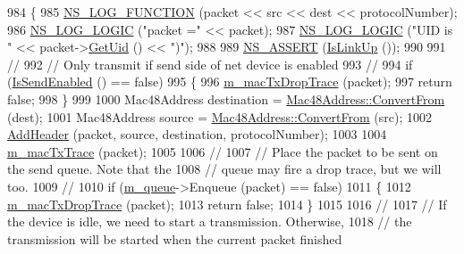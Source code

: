 \begin{DoxyCode}
984 \{
985   \hyperlink{log-macros-disabled_8h_a90b90d5bad1f39cb1b64923ea94c0761}{NS\_LOG\_FUNCTION} (packet << src << dest << protocolNumber);
986   \hyperlink{group__logging_ga88acd260151caf2db9c0fc84997f45ce}{NS\_LOG\_LOGIC} (\textcolor{stringliteral}{"packet ="} << packet);
987   \hyperlink{group__logging_ga88acd260151caf2db9c0fc84997f45ce}{NS\_LOG\_LOGIC} (\textcolor{stringliteral}{"UID is "} << packet->\hyperlink{classns3_1_1Packet_a1f212c825b50e54d94f5b9ae99592e6a}{GetUid} () << \textcolor{stringliteral}{")"});
988 
989   \hyperlink{assert_8h_a6dccdb0de9b252f60088ce281c49d052}{NS\_ASSERT} (\hyperlink{classns3_1_1CsmaNetDevice_a961676d6d97ebdb8605196c96e0d2ef1}{IsLinkUp} ());
990 
991   \textcolor{comment}{//}
992   \textcolor{comment}{// Only transmit if send side of net device is enabled}
993   \textcolor{comment}{//}
994   \textcolor{keywordflow}{if} (\hyperlink{classns3_1_1CsmaNetDevice_a40e5946f8807cb9c65857789c3c2b269}{IsSendEnabled} () == \textcolor{keyword}{false})
995     \{
996       \hyperlink{classns3_1_1CsmaNetDevice_ac6e2a81eedea1fa443600bbac37842b2}{m\_macTxDropTrace} (packet);
997       \textcolor{keywordflow}{return} \textcolor{keyword}{false};
998     \}
999 
1000   Mac48Address destination = \hyperlink{classns3_1_1Mac48Address_a911ce13603a9ef837545a032b6523ae4}{Mac48Address::ConvertFrom} (dest);
1001   Mac48Address source = \hyperlink{classns3_1_1Mac48Address_a911ce13603a9ef837545a032b6523ae4}{Mac48Address::ConvertFrom} (src);
1002   \hyperlink{classns3_1_1CsmaNetDevice_a736bf6ce5851ace677f8fc693a92855c}{AddHeader} (packet, source, destination, protocolNumber);
1003 
1004   \hyperlink{classns3_1_1CsmaNetDevice_acd8f03ea3f02befd6caa2b07065ac80a}{m\_macTxTrace} (packet);
1005 
1006   \textcolor{comment}{//}
1007   \textcolor{comment}{// Place the packet to be sent on the send queue.  Note that the }
1008   \textcolor{comment}{// queue may fire a drop trace, but we will too.}
1009   \textcolor{comment}{//}
1010   \textcolor{keywordflow}{if} (\hyperlink{classns3_1_1CsmaNetDevice_a499be4029c01107f7f16f5371843ffde}{m\_queue}->Enqueue (packet) == \textcolor{keyword}{false})
1011     \{
1012       \hyperlink{classns3_1_1CsmaNetDevice_ac6e2a81eedea1fa443600bbac37842b2}{m\_macTxDropTrace} (packet);
1013       \textcolor{keywordflow}{return} \textcolor{keyword}{false};
1014     \}
1015 
1016   \textcolor{comment}{//}
1017   \textcolor{comment}{// If the device is idle, we need to start a transmission. Otherwise,}
1018   \textcolor{comment}{// the transmission will be started when the current packet finished}

\end{DoxyCode}

